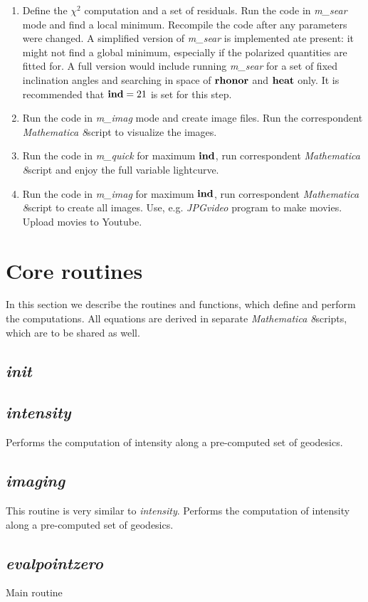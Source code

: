 \documentclass{emulateapj}
\newcommand{\mat}{\textit{Mathematica 8}}
\begin{document}
\begin{enumerate}
\item{Define the $\chi^2$ computation and a set of residuals.  Run the code in \textit{m\_sear} mode and find a local minimum. Recompile the code after any parameters were changed. 
A simplified version of \textit{m\_sear} is implemented ate present: it might not find a global minimum, especially if the polarized quantities are fitted for.
A full version would include running \textit{m\_sear} for a set of fixed inclination angles and searching in space of $\bf rhonor$ and $\bf heat$ only.
It is recommended that ${\bf ind}=21$ is set for this step.}
\item{Run the code in \textit{m\_imag} mode and create image files. Run the correspondent \mat script to visualize the images.}
\item{Run the code in \textit{m\_quick} for maximum $\bf ind$, run correspondent \mat script and enjoy the full variable lightcurve.}
\item{Run the code in \textit{m\_imag} for maximum $\bf ind$, run correspondent \mat script to create all images. Use, e.g. \textit{JPGvideo} program to make movies.
Upload movies to Youtube.}
\end{enumerate}

\section{Core routines}
In this section we describe the routines and functions, which define and perform the computations.
All equations are derived in separate \mat  scripts, which are to be shared as well.
\subsection{\textit{init}}
\subsection{\textit{intensity}}
Performs the computation of intensity along a pre-computed set of geodesics.
\subsection{\textit{imaging}}
This routine is very similar to \textit{intensity}.
Performs the computation of intensity along a pre-computed set of geodesics.
\subsection{\textit{evalpointzero}}
Main routine
\end{document}
